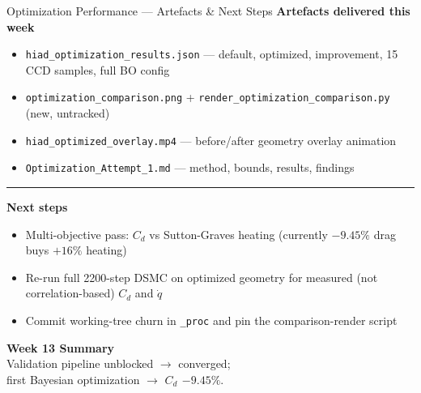 \documentclass[aspectratio=169,10pt]{beamer}
\begin{document}
\begin{frame}{Optimization Performance --- Artefacts \& Next Steps}
  \textbf{Artefacts delivered this week}\\[2pt]
  \begin{itemize}
    \item \texttt{hiad\_optimization\_results.json} --- default,
          optimized, improvement, 15 CCD samples, full BO config
    \item \texttt{optimization\_comparison.png} +
          \texttt{render\_optimization\_comparison.py} (new, untracked)
    \item \texttt{hiad\_optimized\_overlay.mp4} --- before/after
          geometry overlay animation
    \item \texttt{Optimization\_Attempt\_1.md} --- method, bounds,
          results, findings
  \end{itemize}
  \vspace{4pt}
  \hrule
  \vspace{4pt}
  \textbf{Next steps}\\[2pt]
  \begin{itemize}
    \item Multi-objective pass: $C_d$ vs Sutton-Graves heating
          (currently $-9.45\%$ drag buys $+16\%$ heating)
    \item Re-run full 2200-step DSMC on optimized geometry for
          measured (not correlation-based) $C_d$ and $\dot{q}$
    \item Commit working-tree churn in \texttt{\_proc} and pin the
          comparison-render script
  \end{itemize}
\end{frame}

\begin{frame}
  \centering
  \vspace{1.2cm}
  {\Large\bfseries Week 13 Summary}\\[1.2em]
  {Validation pipeline unblocked $\rightarrow$ converged;}\\[0.6em]
  {first Bayesian optimization $\rightarrow$
  \textbf{$C_d$ $-9.45\%$}.}
  \vspace{1.2cm}
\end{frame}
\end{document}
